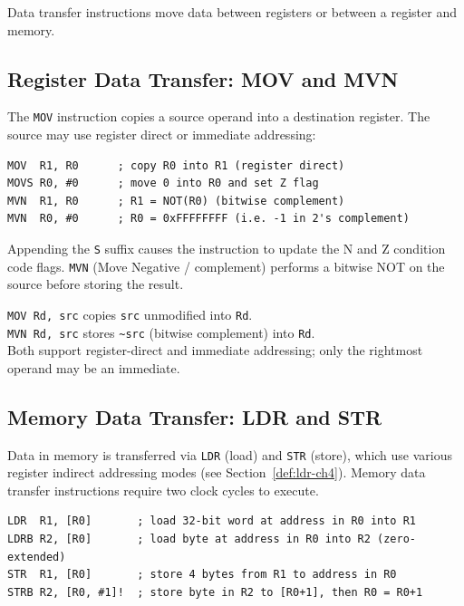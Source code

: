 \documentclass[11pt, a4paper, notitlepage]{report}
\theoremstyle{definition}
\theoremstyle{remark}
\theoremstyle{definition}
\begin{document}
Data transfer instructions move data between registers or between a register and memory.

\subsection{Register Data Transfer: MOV and MVN}

The \texttt{MOV} instruction copies a source operand into a destination register. The source may use register direct or immediate addressing:

\begin{lstlisting}
MOV  R1, R0      ; copy R0 into R1 (register direct)
MOVS R0, #0      ; move 0 into R0 and set Z flag
MVN  R1, R0      ; R1 = NOT(R0) (bitwise complement)
MVN  R0, #0      ; R0 = 0xFFFFFFFF (i.e. -1 in 2's complement)
\end{lstlisting}

Appending the \texttt{S} suffix causes the instruction to update the N and Z condition code flags. \texttt{MVN} (Move Negative / complement) performs a bitwise NOT on the source before storing the result.

\begin{keyresult}[title={MOV vs.\ MVN}]
\texttt{MOV Rd, src} copies \texttt{src} unmodified into \texttt{Rd}.\\
\texttt{MVN Rd, src} stores \texttt{\~{}src} (bitwise complement) into \texttt{Rd}.\\
Both support register-direct and immediate addressing; only the rightmost operand may be an immediate.
\end{keyresult}

\subsection{Memory Data Transfer: LDR and STR}

Data in memory is transferred via \texttt{LDR} (load) and \texttt{STR} (store), which use various register indirect addressing modes (see Section~\ref{def:ldr-ch4}). Memory data transfer instructions require two clock cycles to execute.

\begin{lstlisting}
LDR  R1, [R0]       ; load 32-bit word at address in R0 into R1
LDRB R2, [R0]       ; load byte at address in R0 into R2 (zero-extended)
STR  R1, [R0]       ; store 4 bytes from R1 to address in R0
STRB R2, [R0, #1]!  ; store byte in R2 to [R0+1], then R0 = R0+1
\end{lstlisting}
\end{document}
